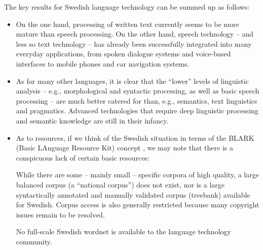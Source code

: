 \begin{multicols}{2}
The key results for Swedish language technology can be summed up as follows:

\begin{itemize}[itemsep=0pt,parsep=0pt]
\item On the one hand, processing of written text currently seems to
  be more mature than speech processing. On the other hand, speech
  technology -- and less so text technology -- has already been
  successfully integrated into many everyday applications, from spoken
  dialogue systems and voice-based interfaces to mobile phones and car
  navigation systems.
\item As for many other languages, it is clear that the ``lower''
  levels of linguistic analysis -- e.g., morphological and syntactic
  processing, as well as basic speech processing -- are much better
  catered for than, e.g., semantics, text linguistics and
  pragmatics. Advanced technologies that require deep linguistic
  processing and semantic knowledge are still in their infancy.
\item As to resources, if we think of the Swedish situation in terms
  of the BLARK (Basic LAnguage Resource Kit) concept \cite{blark}, we
  may note that there is a conspicuous lack of certain basic
  resources:

While there are some -- mainly small -- specific corpora of high
  quality, a large balanced corpus (a ``national corpus'') does not
  exist, nor is a large syntactically annotated and manually validated
  corpus (treebank) available for Swedish. Corpus access is also
  generally restricted because many copyright issues remain to be
  resolved.

No full-scale Swedish wordnet is available to the language
  technology community.


\end{itemize}
\end{multicols}
